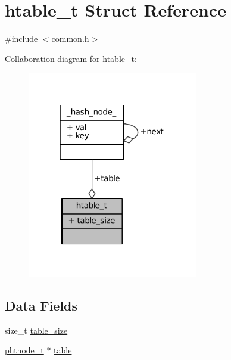 \hypertarget{structhtable__t}{\section{htable\-\_\-t Struct Reference}
\label{structhtable__t}
}


{\ttfamily \#include $<$common.\-h$>$}



Collaboration diagram for htable\-\_\-t\-:
\nopagebreak
\begin{figure}[H]
\begin{center}
\leavevmode
\includegraphics[width=211pt]{structhtable__t__coll__graph}
\end{center}
\end{figure}
\subsection*{Data Fields}
\begin{DoxyCompactItemize}
\item 
size\-\_\-t \hyperlink{structhtable__t_a4b1e1710466cc61c28bae3d4b6e9c063}{table\-\_\-size}
\item 
\hyperlink{common_8h_a083c32a2fd237a02255dbeaa4f72ed4a}{phtnode\-\_\-t} $\ast$ \hyperlink{structhtable__t_a25616ff5782226d344be7754fdb31a79}{table}
\end{DoxyCompactItemize}


